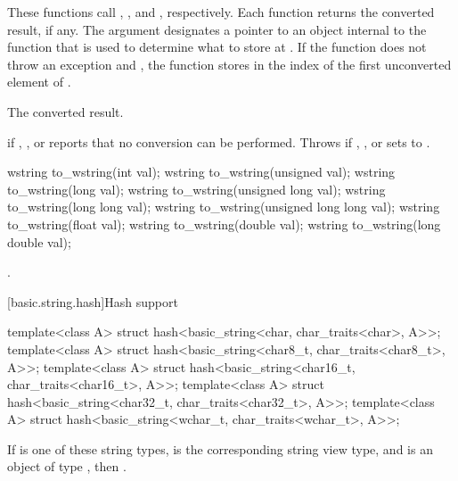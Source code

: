 \begin{itemdescr}
\pnum
\effects
These functions call ,
, and ,
respectively. Each function returns the converted
result, if any. The argument  designates a pointer to an object internal to
the function that is used to determine what to store at . If the function
does not throw an exception and , the function stores in 
the index of the first unconverted element of .

\pnum
\returns
The converted result.

\pnum
\throws
{} if , , or  reports that no
conversion can be performed. Throws  if , , or
 sets  to .
\end{itemdescr}

%
\begin{itemdecl}
wstring to_wstring(int val);
wstring to_wstring(unsigned val);
wstring to_wstring(long val);
wstring to_wstring(unsigned long val);
wstring to_wstring(long long val);
wstring to_wstring(unsigned long long val);
wstring to_wstring(float val);
wstring to_wstring(double val);
wstring to_wstring(long double val);
\end{itemdecl}

\begin{itemdescr}
\pnum
\returns
{}.
\end{itemdescr}

[basic.string.hash]{Hash support}

%
\begin{itemdecl}
template<class A> struct hash<basic_string<char, char_traits<char>, A>>;
template<class A> struct hash<basic_string<char8_t, char_traits<char8_t>, A>>;
template<class A> struct hash<basic_string<char16_t, char_traits<char16_t>, A>>;
template<class A> struct hash<basic_string<char32_t, char_traits<char32_t>, A>>;
template<class A> struct hash<basic_string<wchar_t, char_traits<wchar_t>, A>>;
\end{itemdecl}

\begin{itemdescr}
\pnum
If  is one of these string types,
 is the corresponding string view type, and
 is an object of type ,
then .
\end{itemdescr}

